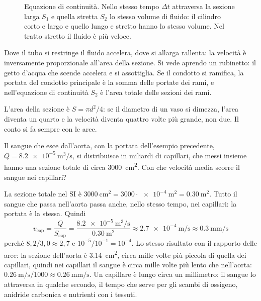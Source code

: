 \begin{figure}[h]
\centering

\caption{Equazione di continuità. Nello stesso tempo $\Delta t$ attraversa la sezione larga $S_1$ e quella stretta $S_2$ lo stesso volume di fluido: il cilindro corto e largo e quello lungo e stretto hanno lo stesso volume. Nel tratto stretto il fluido è più veloce.}
\label{fig:ud3-continuita}
\end{figure}

Dove il tubo si restringe il fluido accelera, dove si allarga rallenta: la velocità è inversamente proporzionale all'area della sezione. Si vede aprendo un rubinetto: il getto d'acqua che scende accelera e si assottiglia. Se il condotto si ramifica, la portata del condotto principale è la somma delle portate dei rami, e nell'equazione di continuità $S_2$ è l'area totale delle sezioni dei rami.

\begin{attenzione}
L'area della sezione è $S = \pi d^2/4$: se il diametro di un vaso si dimezza, l'area diventa un quarto e la velocità diventa quattro volte più grande, non due. Il conto si fa sempre con le aree.
\end{attenzione}

\begin{esempio}
Il sangue che esce dall'aorta, con la portata dell'esempio precedente, $Q = \SI{8,2e-5}{\metre\cubed\per\second}$, si distribuisce in miliardi di capillari, che messi insieme hanno una sezione totale di circa \SI{3000}{\centi\metre\squared}. Con che velocità media scorre il sangue nei capillari?

La sezione totale nel SI è $\SI{3000}{\centi\metre\squared} = \num{3000} \cdot \SI{e-4}{\metre\squared} = \SI{0,30}{\metre\squared}$. Tutto il sangue che passa nell'aorta passa anche, nello stesso tempo, nei capillari: la portata è la stessa. Quindi
\[
  v_\text{cap} = \frac{Q}{S_\text{cap}} = \frac{\SI{8,2e-5}{\metre\cubed\per\second}}{\SI{0,30}{\metre\squared}} \approx \SI{2,7e-4}{\metre\per\second} \approx \SI{0,3}{\milli\metre\per\second}
\]
perché $8{,}2/3{,}0 \approx 2{,}7$ e $10^{-5}/10^{-1} = 10^{-4}$. Lo stesso risultato con il rapporto delle aree: la sezione dell'aorta è \SI{3,14}{\centi\metre\squared}, circa mille volte più piccola di quella dei capillari, quindi nei capillari il sangue è circa mille volte più lento che nell'aorta: $\SI{0,26}{\metre\per\second}/1000 \approx \SI{0,26}{\milli\metre\per\second}$. Un capillare è lungo circa un millimetro: il sangue lo attraversa in qualche secondo, il tempo che serve per gli scambi di ossigeno, anidride carbonica e nutrienti con i tessuti.
\end{esempio}

